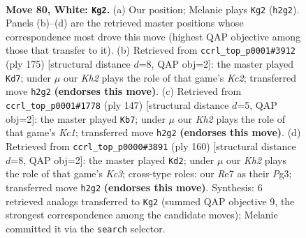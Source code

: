 \documentclass[11pt]{article}
\begin{document}
\clearpage

\begin{figure}[p]\centering
\begin{subfigure}{0.46\textwidth}\centering
\resizebox{\linewidth}{!}{%
\newchessgame
\chessboard[
  setfen={5r1k/P3R3/8/8/8/8/7K/8 w - - 29 80},
  showmover=false,
  pgfstyle=straightmove, color=movearrow, markmove={h2-g2}
]}
\caption{}
\end{subfigure}\hfill
\begin{subfigure}{0.46\textwidth}\centering
\resizebox{\linewidth}{!}{%
\newchessgame
\chessboard[
  setfen={8/2k5/4p3/8/5P2/3K4/6r1/3R4 b - - 4 88},
  showmover=false,
  pgfstyle=straightmove, color=movearrow, markmove={c7-d7}
]}
\caption{}
\end{subfigure}
\\[4pt]
\begin{subfigure}{0.46\textwidth}\centering
\resizebox{\linewidth}{!}{%
\newchessgame
\chessboard[
  setfen={2k5/p7/8/8/8/2N5/5K1R/r7 b - - 0 74},
  showmover=false,
  pgfstyle=straightmove, color=movearrow, markmove={c8-b7}
]}
\caption{}
\end{subfigure}\hfill
\begin{subfigure}{0.46\textwidth}\centering
\resizebox{\linewidth}{!}{%
\newchessgame
\chessboard[
  setfen={2R5/7r/8/5p1k/8/2K3P1/8/8 w - - 9 81},
  showmover=false,
  pgfstyle=straightmove, color=movearrow, markmove={c3-d2}
]}
\caption{}
\end{subfigure}
\caption{\textbf{Move 80, White: \texttt{Kg2}.} (a) Our position; Melanie plays \texttt{Kg2} (\texttt{h2g2}). Panels (b)--(d) are the retrieved master positions whose correspondence most drove this move (highest QAP objective among those that transfer to it). (b) Retrieved from \texttt{ccrl\_top\_p0001\#3912} (ply 175) [structural distance $d$=8, QAP obj=2]: the master played \texttt{Kd7}; under $\mu$ our \emph{Kh2} plays the role of that game's \emph{Kc2}; transferred move \texttt{h2g2} \textbf{(endorses this move)}. (c) Retrieved from \texttt{ccrl\_top\_p0001\#1778} (ply 147) [structural distance $d$=5, QAP obj=2]: the master played \texttt{Kb7}; under $\mu$ our \emph{Kh2} plays the role of that game's \emph{Kc1}; transferred move \texttt{h2g2} \textbf{(endorses this move)}. (d) Retrieved from \texttt{ccrl\_top\_p0000\#3891} (ply 160) [structural distance $d$=8, QAP obj=2]: the master played \texttt{Kd2}; under $\mu$ our \emph{Kh2} plays the role of that game's \emph{Kc3}; cross-type roles: our \emph{R}e7 as their \emph{P}g3; transferred move \texttt{h2g2} \textbf{(endorses this move)}. Synthesis: 6 retrieved analogs transferred to \texttt{Kg2} (summed QAP objective 9, the strongest correspondence among the candidate moves); Melanie committed it via the \texttt{search} selector.}
\label{fig:thought-m158}
\end{figure}
\end{document}
